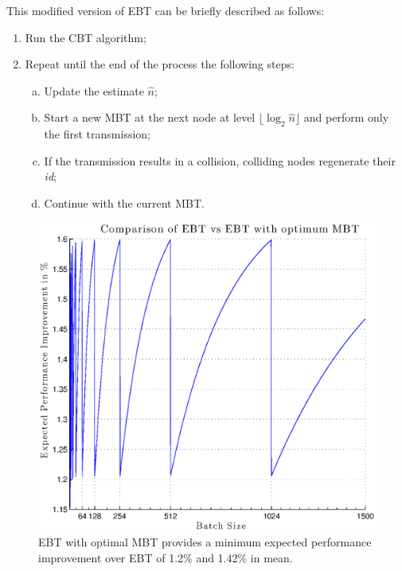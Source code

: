 \documentclass[12pt,a4paper]{report}
\begin{document}
\noindent This modified version of EBT can be briefly described as follows:
 \begin{enumerate}
\item Run the CBT algorithm;
\item Repeat until the end of the process the following steps:
\begin{enumerate}[a)]
\item Update the estimate $\hat{n}$;
\item Start a new MBT at the next node at level $\lfloor\log_{2}\hat{n}\rfloor$ and perform only the first transmission;
\item If the transmission results in a collision, colliding nodes regenerate their \emph{id};
\item Continue  with the current MBT.
\end{enumerate}
\end{enumerate}

\begin{figure}[htb]
\begin{center}
\includegraphics[scale=0.7]{matlab/BTs/EBT-EBT_MBT-Comparison}
\caption[\emph{EBT} vs \emph{EBT with optimal MBT} Performance Comparison]{EBT with optimal MBT provides a minimum expected performance improvement over EBT of 1.2\% and 1.42\% in mean.}
\label{EBTvsEBTopt}
\end{center}
\end{figure}
\end{document}
